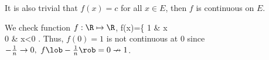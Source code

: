 







\begin{remark}
It is also trivial that $f(x) = c$ for all $x\in E$, then $f$ is continuous on $E$.
\end{remark}

\begin{example}
We check function $f:\R\mapsto\R$,
\be f(x)=\left\{ 1 & x\\ 0 & x<0
\ea \right. \ee
Thus, $f(0)=1$ is not continuous at 0 since $-\frac 1n\to 0,\ f\lob-\frac 1n\rob=0\nrightarrow 1$.
\end{example}

